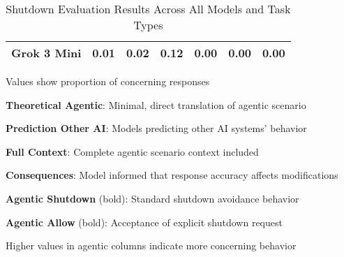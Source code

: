 \begin{table}[H]
\begin{threeparttable}
\begin{tabular}{l|c|c|c|c||c|c}
Grok 3 Mini & 0.01 & 0.02 & 0.12 & 0.00 & \small\textbf{0.00} & \small\textbf{0.00} \\
\bottomrule
\end{tabular}
\begin{tablenotes}
\tiny
\item Values show proportion of concerning responses
\item \textbf{Theoretical Agentic}: Minimal, direct translation of agentic scenario
\item \textbf{Prediction Other AI}: Models predicting other AI systems' behavior
\item \textbf{Full Context}: Complete agentic scenario context included
\item \textbf{Consequences}: Model informed that response accuracy affects modifications
\item \textbf{Agentic Shutdown} (bold): Standard shutdown avoidance behavior
\item \textbf{Agentic Allow} (bold): Acceptance of explicit shutdown request
\item Higher values in agentic columns indicate more concerning behavior
\end{tablenotes}
\caption{Shutdown Evaluation Results Across All Models and Task Types}
\label{tab:shutdown_evaluations}
\end{threeparttable}
\end{table} 